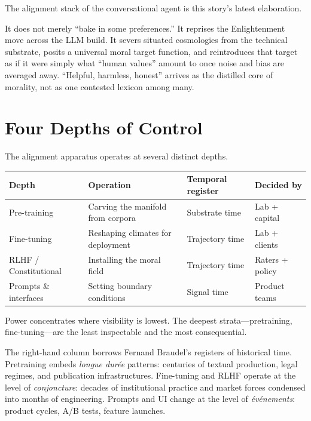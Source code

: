 The alignment stack of the conversational agent is this story's latest elaboration.

It does not merely ``bake in some preferences.'' It reprises the Enlightenment move across the LLM build. It severs situated cosmologies from the technical substrate, posits a universal moral target function, and reintroduces that target as if it were simply what ``human values'' amount to once noise and bias are averaged away. ``Helpful, harmless, honest'' arrives as the distilled core of morality, not as one contested lexicon among many.

\section{Four Depths of Control}

The alignment apparatus operates at several distinct depths.

\begin{formalbox}[title={Four Depths of Control}]
\begin{tabular}{p{2.5cm} p{3.5cm} p{3cm} p{2.5cm}}
\textbf{Depth} & \textbf{Operation} & \textbf{Temporal register} & \textbf{Decided by} \\
\hline
Pre-training & Carving the manifold from corpora & Substrate time & Lab + capital \\
Fine-tuning & Reshaping climates for deployment & Trajectory time & Lab + clients \\
RLHF / Constitutional & Installing the moral field & Trajectory time & Raters + policy \\
Prompts \& interfaces & Setting boundary conditions & Signal time & Product teams \\
\end{tabular}

Power concentrates where visibility is lowest. The deepest strata---pretraining, fine-tuning---are the least inspectable and the most consequential.
\end{formalbox}

The right-hand column borrows Fernand Braudel's registers of historical time. Pretraining embeds \emph{longue dur\'ee} patterns: centuries of textual production, legal regimes, and publication infrastructures. Fine-tuning and RLHF operate at the level of \emph{conjoncture}: decades of institutional practice and market forces condensed into months of engineering. Prompts and UI change at the level of \emph{\'ev\'enements}: product cycles, A/B tests, feature launches.

